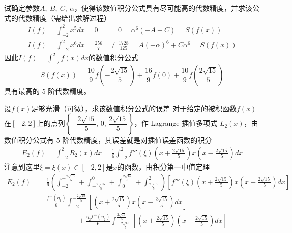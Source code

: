 \documentclass[11pt]{article}
\begin{document}
\begin{question}
\begin{subquestion}{试确定参数$A,\ B,\ C,\ \alpha$，使得该数值积分公式具有尽可能高的代数精度，并求该公式的代数精度（需给出求解过程）}
{            \begin{align*}
                I(f) = \int_{-2}^{2}{x^5dx} = 0             & =0= \alpha^6(-A + C) = S\left(f(x)\right)                             \\
                I(f) = \int_{-2}^{2}{x^6dx} = \frac{256}{7} & \neq \frac{1728}{125} = A(-\alpha)^6 + C\alpha^6 = S\left(f(x)\right)
            \end{align*}
            因此$I(f) = \displaystyle \int_{-2}^{2}{f(x)dx}$的数值积分公式
            \begin{equation*}
                S\left(f(x)\right) = \frac{10}{9}f\left(-\frac{2\sqrt{15}}{5}\right) + \frac{16}{9}f(0) + \frac{10}{9}f\left(\frac{2\sqrt{15}}{5}\right)
            \end{equation*}
            具有最高的 5 阶代数精度。
        }
    \end{subquestion}
    \begin{subquestion}{设$f(x)$足够光滑（可微），求该数值积分公式的误差}
        \answer
        {
            对于给定的被积函数$f(x)$在$[-2, 2]$上的点列$\left\{-\dfrac{2\sqrt{15}}{5},\, 0,\, \dfrac{2\sqrt{15}}{5}\right\}$，作 Lagrange 插值多项式 $L_2(x)$，由数值积分公式有 5 阶代数精度，其误差就是对插值误差函数的积分
            \begin{align*}
                E_2(f) = \int_{-2}^{2}{R_2(x)dx} = \frac{1}{6}\int_{-2}^{2}{f'''(\xi)\left(x + \frac{2\sqrt{15}}{5}\right)x\left(x - \frac{2\sqrt{15}}{5}\right)dx}
            \end{align*}
            注意到这里$\xi = \xi(x) \in [-2, 2]$是$x$的函数，由积分第一中值定理
            \begin{align*}
                E_2(f) & = \frac{1}{6}\left(\int_{-2}^{-\frac{2\sqrt{15}}{5}} + \int_{-\frac{2\sqrt{15}}{5}}^{0} + \int_{0}^{\frac{2\sqrt{15}}{5}} + \int_{\frac{2\sqrt{15}}{5}}^{2}\right){\left[f'''(\xi)\left(x + \frac{2\sqrt{15}}{5}\right)x\left(x - \frac{2\sqrt{15}}{5}\right)dx\right]} \\
                       & = \frac{f'''(\eta_1)}{6}\int_{-2}^{-\frac{2\sqrt{15}}{5}}{\left[\left(x + \frac{2\sqrt{15}}{5}\right)x\left(x - \frac{2\sqrt{15}}{5}\right)dx\right]}                                                                                                                   \\
                       & \phantom{1+1+1+1} +\frac{\eta_2f'''(\eta_2)}{6}\int_{-\frac{2\sqrt{15}}{5}}^{\frac{2\sqrt{15}}{5}}{\left[\left(x + \frac{2\sqrt{15}}{5}\right)\left(x - \frac{2\sqrt{15}}{5}\right)dx\right]}                                                                           \\

\end{align*}}
\end{subquestion}
\end{question}
\end{document}
